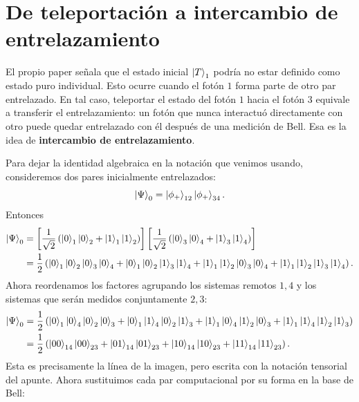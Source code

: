 \documentclass[../main.tex]{subfiles}
\begin{document}
\section{De teleportación a intercambio de entrelazamiento}

El propio paper señala que el estado inicial $\ket{T}_1$ podría no estar definido como estado puro individual. Esto ocurre cuando el fotón $1$ forma parte de otro par entrelazado. En tal caso, teleportar el estado del fotón $1$ hacia el fotón $3$ equivale a transferir el entrelazamiento: un fotón que nunca interactuó directamente con otro puede quedar entrelazado con él después de una medición de Bell. Esa es la idea de \textbf{intercambio de entrelazamiento}.

Para dejar la identidad algebraica en la notación que venimos usando, consideremos dos pares inicialmente entrelazados:
\begin{equation*}
    \ket{\Psi}_0=\ket{\phi_+}_{12}\ket{\phi_+}_{34}.
\end{equation*}
Entonces
\begin{align*}
    \ket{\Psi}_0
    &=
    \left[
        \frac{1}{\sqrt{2}}
        \left(
            \ket{0}_1\ket{0}_2+
            \ket{1}_1\ket{1}_2
        \right)
    \right]
    \left[
        \frac{1}{\sqrt{2}}
        \left(
            \ket{0}_3\ket{0}_4+
            \ket{1}_3\ket{1}_4
        \right)
    \right]\\
    &=
    \frac{1}{2}
    \left(
        \ket{0}_1\ket{0}_2\ket{0}_3\ket{0}_4
        +
        \ket{0}_1\ket{0}_2\ket{1}_3\ket{1}_4
        +
        \ket{1}_1\ket{1}_2\ket{0}_3\ket{0}_4
        +
        \ket{1}_1\ket{1}_2\ket{1}_3\ket{1}_4
    \right).
\end{align*}
Ahora reordenamos los factores agrupando los sistemas remotos $1,4$ y los sistemas que serán medidos conjuntamente $2,3$:
\begin{align*}
    \ket{\Psi}_0
    &=
    \frac{1}{2}
    \left(
        \ket{0}_1\ket{0}_4\ket{0}_2\ket{0}_3
        +
        \ket{0}_1\ket{1}_4\ket{0}_2\ket{1}_3
        +
        \ket{1}_1\ket{0}_4\ket{1}_2\ket{0}_3
        +
        \ket{1}_1\ket{1}_4\ket{1}_2\ket{1}_3
    \right)\\
    &=
    \frac{1}{2}
    \left(
        \ket{00}_{14}\ket{00}_{23}
        +
        \ket{01}_{14}\ket{01}_{23}
        +
        \ket{10}_{14}\ket{10}_{23}
        +
        \ket{11}_{14}\ket{11}_{23}
    \right).
\end{align*}
Esta es precisamente la línea de la imagen, pero escrita con la notación tensorial del apunte. Ahora sustituimos cada par computacional por su forma en la base de Bell:
\end{document}
